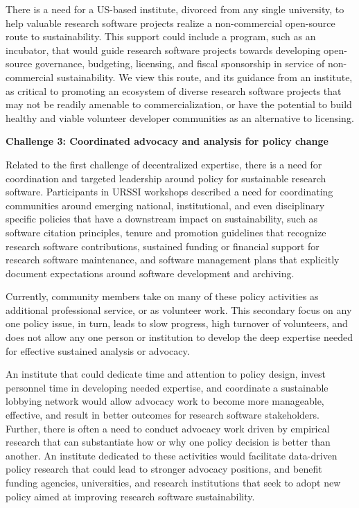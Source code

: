 \documentclass[
]{book}
\begin{document}
There is a need for a US-based institute, divorced from any single university,
to help valuable research software projects realize a non-commercial
open-source route to sustainability. This support could include a program, such as an
incubator, that would guide research software projects towards developing
open-source governance, budgeting, licensing, and fiscal sponsorship in service
of non-commercial sustainability. We view this route, and its guidance from an
institute, as critical to promoting an ecosystem of diverse research software
projects that may not be readily amenable to commercialization, or have the
potential to build healthy and viable volunteer developer communities as an
alternative to licensing.

\textbf{Challenge 3: Coordinated advocacy and analysis for policy change}

Related to the first challenge of decentralized expertise, there is a need
for coordination and targeted leadership around policy for sustainable
research software. Participants in URSSI workshops described a need for
coordinating communities around emerging national, institutional, and even
disciplinary specific policies that have a downstream impact on sustainability,
such as software citation principles, tenure and promotion guidelines that
recognize research software contributions, sustained funding or financial
support for research software maintenance, and software management plans
that explicitly document expectations around software development and archiving.

Currently, community members take on many of these policy activities as additional
professional service, or as volunteer work. This secondary focus on any
one policy issue, in turn, leads to slow progress, high turnover of volunteers,
and does not allow any one person or institution to develop the deep expertise
needed for effective sustained analysis or advocacy.

An institute that could dedicate time and attention to policy design, invest
personnel time in developing needed expertise, and coordinate a sustainable
lobbying network would allow advocacy work to become more manageable,
effective, and result in better outcomes for research software stakeholders.
Further, there is often a need to conduct advocacy work driven by
empirical research that can substantiate how or why one policy decision is
better than another. An institute dedicated to these activities would
facilitate data-driven policy research that could lead to stronger advocacy
positions, and benefit funding agencies, universities, and research
institutions that seek to adopt new policy aimed at improving research
software sustainability.
\end{document}
